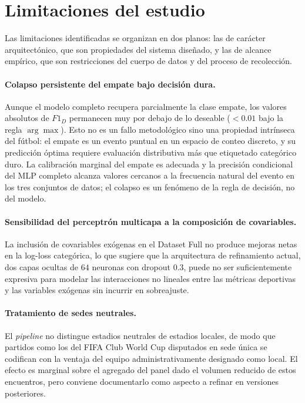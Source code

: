 \section{Limitaciones del estudio}

Las limitaciones identificadas se organizan en dos planos: las de car\'acter arquitect\'onico, que son propiedades del sistema dise\~nado, y las de alcance emp\'irico, que son restricciones del cuerpo de datos y del proceso de recolecci\'on.

\paragraph{Colapso persistente del empate bajo decisi\'on dura.} Aunque el modelo completo recupera parcialmente la clase empate, los valores absolutos de $F1_D$ permanecen muy por debajo de lo deseable ($<0{.}01$ bajo la regla $\arg\max$). Esto no es un fallo metodol\'ogico sino una propiedad intr\'inseca del f\'utbol: el empate es un evento puntual en un espacio de conteo discreto, y su predicci\'on \'optima requiere evaluaci\'on distributiva m\'as que etiquetado categ\'orico duro. La calibraci\'on marginal del empate es adecuada y la precisi\'on condicional del MLP completo alcanza valores cercanos a la frecuencia natural del evento en los tres conjuntos de datos; el colapso es un fen\'omeno de la regla de decisi\'on, no del modelo.

\paragraph{Sensibilidad del perceptr\'on multicapa a la composici\'on de covariables.} La inclusi\'on de covariables ex\'ogenas en el Dataset Full no produce mejoras netas en la log-loss categ\'orica, lo que sugiere que la arquitectura de refinamiento actual, dos capas ocultas de $64$ neuronas con dropout $0{.}3$, puede no ser suficientemente expresiva para modelar las interacciones no lineales entre las m\'etricas deportivas y las variables ex\'ogenas sin incurrir en sobreajuste.

\paragraph{Tratamiento de sedes neutrales.} El \textit{pipeline} no distingue estadios neutrales de estadios locales, de modo que partidos como los del FIFA Club World Cup disputados en sede \'unica se codifican con la ventaja del equipo administrativamente designado como local. El efecto es marginal sobre el agregado del panel dado el volumen reducido de estos encuentros, pero conviene documentarlo como aspecto a refinar en versiones posteriores.

